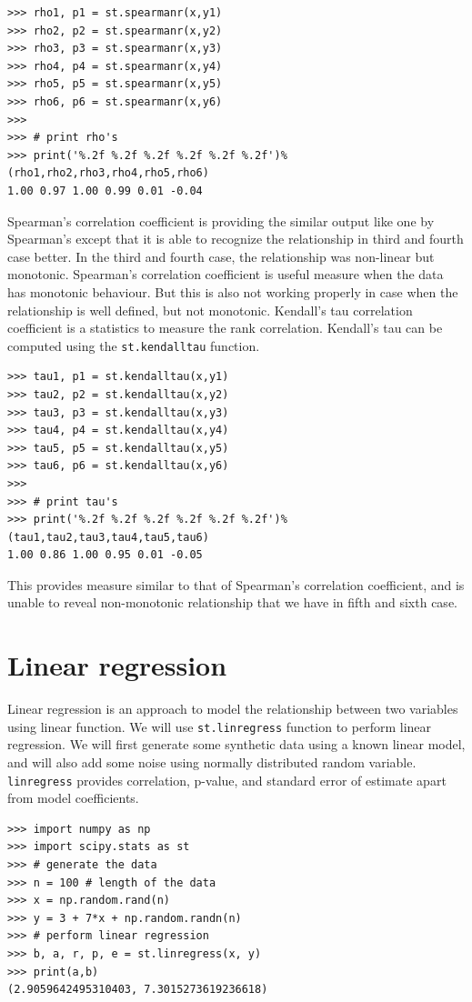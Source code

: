 \documentclass[10pt]{book}
\begin{document}
{\begin{verbatim}
>>> rho1, p1 = st.spearmanr(x,y1)
>>> rho2, p2 = st.spearmanr(x,y2)
>>> rho3, p3 = st.spearmanr(x,y3)
>>> rho4, p4 = st.spearmanr(x,y4)
>>> rho5, p5 = st.spearmanr(x,y5)
>>> rho6, p6 = st.spearmanr(x,y6)
>>> 
>>> # print rho's
>>> print('%.2f %.2f %.2f %.2f %.2f %.2f')%(rho1,rho2,rho3,rho4,rho5,rho6)
1.00 0.97 1.00 0.99 0.01 -0.04
\end{verbatim} \afterverb
Spearman's correlation coefficient is providing the similar output like one by Spearman's except that it is able to recognize the relationship in third and fourth case better. In the third and fourth case, the relationship was non-linear but monotonic. Spearman's correlation coefficient is useful measure when the data has monotonic behaviour. But this is also not working properly in case when the relationship is well defined, but not monotonic. Kendall's tau correlation coefficient is a statistics to measure the rank correlation. Kendall's tau can be computed using the \verb"st.kendalltau" function. 
\beforeverb \begin{verbatim}
>>> tau1, p1 = st.kendalltau(x,y1)
>>> tau2, p2 = st.kendalltau(x,y2)
>>> tau3, p3 = st.kendalltau(x,y3)
>>> tau4, p4 = st.kendalltau(x,y4)
>>> tau5, p5 = st.kendalltau(x,y5)
>>> tau6, p6 = st.kendalltau(x,y6)
>>> 
>>> # print tau's
>>> print('%.2f %.2f %.2f %.2f %.2f %.2f')%(tau1,tau2,tau3,tau4,tau5,tau6)
1.00 0.86 1.00 0.95 0.01 -0.05
\end{verbatim} \afterverb
This provides measure similar to that of Spearman's correlation coefficient, and is unable to reveal non-monotonic relationship that we have in fifth and sixth case. 

\section{Linear regression}
Linear regression is an approach to model the relationship between two variables using linear function. We will use \verb"st.linregress" function to perform linear regression. We will first generate some synthetic data using a known linear model,
and will also add some noise using normally distributed random variable. \verb"linregress" provides correlation, p-value, and standard error of estimate apart from model coefficients.  

\beforeverb \begin{verbatim}
>>> import numpy as np
>>> import scipy.stats as st
>>> # generate the data
>>> n = 100 # length of the data
>>> x = np.random.rand(n)
>>> y = 3 + 7*x + np.random.randn(n)
>>> # perform linear regression
>>> b, a, r, p, e = st.linregress(x, y)
>>> print(a,b)
(2.9059642495310403, 7.3015273619236618)
\end{verbatim} \afterverb

}
\end{document}
